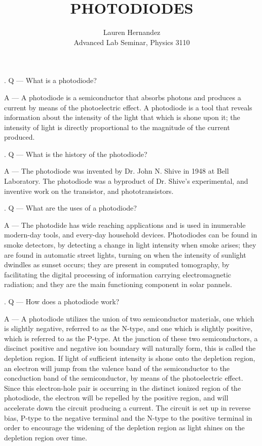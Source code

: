 \documentclass[12pt]{article}
\newcounter{question}
\begin{document}
	
	\title{PHOTODIODES}%
	\author{Lauren Hernandez\\ %
		Advanced Lab Seminar, Physics 3110} %
	
	\maketitle
	


		
		\newcommand\Que[1]{%
			\leavevmode\par
			\stepcounter{question}
			\noindent
			\thequestion. Q --- #1\par}
		
		\newcommand\Ans[2][]{%
			\leavevmode\par\noindent
			{\leftskip37pt
				A --- \textbf{#1}#2\par}}
		
		\Que{What is a photodiode?}
		\Ans{A photodiode is a semiconductor that absorbs photons and produces a current by means of the photoelectric effect. A photodiode is a tool that reveals information about the intensity of the light that which is shone upon it; the intensity of light is directly proportional  to the magnitude of the current produced. }
		
		\Que{What is the history of the photodiode?}
		\Ans{The photodiode was invented by Dr. John N. Shive in 1948 at Bell Laboratory. The photodiode was a byproduct of Dr. Shive's experimental, and inventive work on the transistor, and phototransistors.}
		
		\Que{What are the uses of a photodiode?}
		\Ans{The photodide has wide reaching applications and is used in inumerable modern-day tools, and every-day household devices. Photodiodes can be found in smoke detectors, by detecting a change in light intensity when smoke arises; they are found in automatic street lights, turning on when the intensity of sunlight dwindles as sunset occurs; they are present in computed tomography, by facilitating the digital processing of information carrying electromagnetic radiation; and they are the main functioning component in solar pannels. }
		
		\Que{How does a photodiode work?}
		\Ans{A photodiode utilizes the union of two semiconductor materials, one which is slightly negative, referred to as the N-type, and one which is slightly positive, which is referred to as the P-type. At the junction of these two semiconductors, a discinct positive and negative ion boundary will naturally form, this is called the depletion region. If light of sufficient intensity is shone onto the depletion region, an electron will jump from the valence band of the semiconductor to the concduction band of the semiconductor, by means of the photoelectric effect. Since this electron-hole pair is occurring in the distinct ionized region of the photodiode, the electron will be repelled by the positive region, and will accelerate down the circuit producing a current. The circuit is set up in reverse bias, P-type to the negative terminal and the N-type to the positive terminal in order to encourage the widening of the depletion region as light shines on the depletion region over time. }
		
\end{document}
